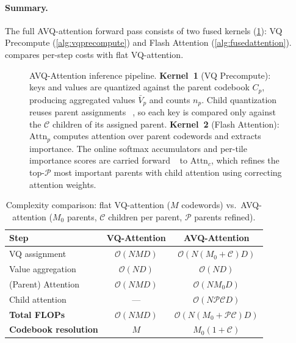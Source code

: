 \paragraph{Summary.}
The full AVQ-attention forward pass consists of two fused kernels (\cref{fig:pipeline}): VQ Precompute (\cref{alg:vqprecompute}) and Flash Attention (\cref{alg:fusedattention}).  compares per-step costs with flat VQ-attention.
\begin{figure}[t]
\centering

\caption{AVQ-Attention inference pipeline. \textbf{Kernel~1} (VQ Precompute): keys and values are quantized against the parent codebook $C_p$, producing aggregated values $\bar{V}_p$ and counts $n_p$. Child quantization reuses parent assignments~\textcircled{}, so each key is compared only against the $\mathcal{C}$ children of its assigned parent. \textbf{Kernel~2} (Flash Attention): $\text{Attn}_p$ computes attention over parent codewords and extracts importance. The online softmax accumulators and per-tile importance scores are carried forward~\textcircled{} to $\text{Attn}_c$, which refines the top-$\mathcal{P}$ most important parents with child attention using correcting attention weights.}
\label{fig:pipeline}
\end{figure}
\begin{table}[h]
\centering
\caption{Complexity comparison: flat VQ-attention ($M$ codewords) vs.\ AVQ-attention ($M_0$ parents, $\mathcal{C}$ children per parent, $\mathcal{P}$ parents refined).}
\label{tab:complexity}
\begin{tabular}{lcc}
\toprule
\textbf{Step} & \textbf{VQ-Attention} & \textbf{AVQ-Attention} \\
\midrule
VQ assignment & $\mathcal{O}(NMD)$ & $\mathcal{O}(N(M_0 + \mathcal{C})D)$ \\
Value aggregation & $\mathcal{O}(ND)$ & $\mathcal{O}(ND)$ \\
(Parent) Attention & $\mathcal{O}(NMD)$ & $\mathcal{O}(NM_0 D)$ \\
Child attention & --- & $\mathcal{O}(N\mathcal{P}\mathcal{C}D)$ \\
\midrule
\textbf{Total FLOPs} & $\mathcal{O}(NMD)$ & $\mathcal{O}(N(M_0 + \mathcal{P}\mathcal{C})D)$ \\
\textbf{Codebook resolution} & $M$ & $M_0(1 + \mathcal{C})$ \\
\bottomrule
\end{tabular}
\end{table}

